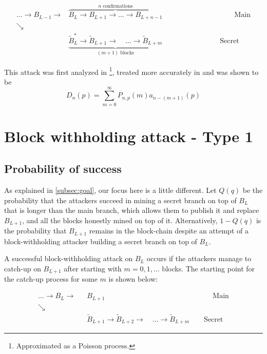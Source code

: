 \documentclass[letterpaper,12pt]{report}
\theoremstyle{plain}
\theoremstyle{definition}
\begin{document}
\begin{eqnarray}\label{dsfigure}
 \dots \rightarrow \mathit{B}_{L-1}\rightarrow &\overbrace{\mathit{B}_{L}\rightarrow\mathit{B}_{L+1}
\rightarrow\dots\rightarrow\mathit{B}_{L+n-1}}^{n \; \mathrm{confirmations}} \qquad\qquad\qquad\qquad\qquad \mathrm{Main}\\\nonumber
\searrow & \\\nonumber
\qquad \qquad \qquad & \underbrace{\widetilde{\mathit{B}}_{L}^{*}\rightarrow\widetilde{\mathit{B}}_{L+1}
\longrightarrow \quad \dots \longrightarrow\widetilde{\mathit{B}}_{L+m}}_{(m+1)\; \mathrm{ blocks}}\qquad\qquad\qquad\qquad \mathrm{Secret}
\end{eqnarray}

This attack was first analyzed in \cite{Bitcoin}\footnote{Approximated as a Poisson process.}, treated more accurately in \cite{Doublespend} and was shown to be 
\begin{equation}\label{eqn:ds}
D_n(p)=\sum_{m=0}^{\infty}P_{n,p}(m)\mathit{a}_{n-(m+1)}(p)
\end{equation}

\section{Block withholding attack - Type 1}

\subsection{Probability of success}\label{probabilityofsuccess}

As explained in \ref{subsec:goal}, our focus here is a little different. Let $\mathit{Q}(q)$  be the probability that the attackers succeed in mining a secret branch on top of $\mathit{B}_L$ that is longer than the main branch, which allows them to publish it and replace $\mathit{B}_{L+1}$, and all the blocks honestly mined on top of it. Alternatively, $1-\mathit{Q}(q)$ is the probability that $\mathit{B}_{L+1}$ remains in the block-chain despite an attempt of a block-withholding attacker building a secret branch on top of $\mathit{B}_L$.

A successful block-withholding attack on $\mathit{B}_L$ occurs if the attackers manage to catch-up on $B_{L+1}$ after starting with $m=0,1,\dots$ blocks. The starting point for the catch-up process for some $m$ is shown below:

\begin{eqnarray}\label{blockwithholdingboundary}
 \dots \rightarrow \mathit{B}_L\rightarrow &\mathit{B}_{L+1} \qquad\qquad\qquad\qquad\qquad\qquad\qquad\quad \mathrm{Main}\\\nonumber
\searrow & \\\nonumber
\qquad \qquad \qquad & \widetilde{\mathit{B}}_{L+1}\rightarrow\widetilde{\mathit{B}}_{L+2}
\longrightarrow \quad \dots \longrightarrow\widetilde{\mathit{B}}_{L+m}\qquad \mathrm{Secret}
\end{eqnarray}
\end{document}
